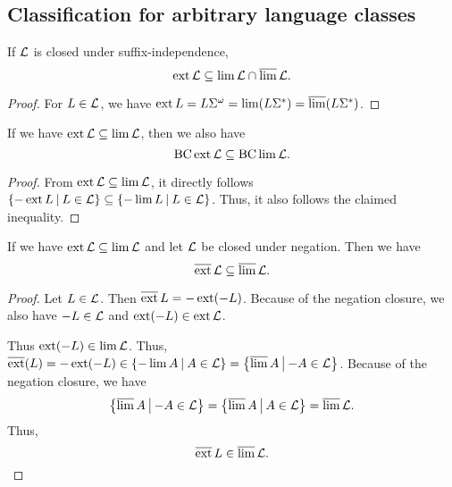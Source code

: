 \subsection{Classification for arbitrary language classes}
\label{gen:general}

\begin{lemma}
\label{gen:non-suffix-sens}
If $\mathcal{L}$ is closed under suffix-independence,
\[ \operatorname{ext} \mathcal{L} \subseteq \lim \mathcal{L} \cap \operatorname{\overline{lim}} \mathcal{L} . \]
\begin{proof}
For $L \in \mathcal{L}$, we have $\operatorname{ext} L = L \Sigma^\omega = \lim (L \Sigma^*) = \operatorname{\overline{lim}} (L \Sigma^*)$.
\end{proof}
\end{lemma}

\begin{lemma}
\label{gen:S302a} If we have $\operatorname{ext} \mathcal{L} \subseteq \lim \mathcal{L}$, then we also have
\[ \operatorname{BC} \operatorname{ext} \mathcal{L} \subseteq \operatorname{BC} \lim \mathcal{L} . \]
\begin{proof}
From $\operatorname{ext} \mathcal{L} \subseteq \lim \mathcal{L}$, it directly follows $\Set{-\ext L}{L \in \Lang} \subseteq \Set{-\lim L}{L \in \Lang}$. Thus, it also follows the claimed inequality.
\end{proof}
\end{lemma}

\begin{lemma}
\label{gen:DExtInDLim}
If we have $\operatorname{ext} \mathcal{L} \subseteq \lim \mathcal{L}$ and let $\mathcal{L}$ be closed under negation. Then we have
\[ \operatorname{\overline{ext}} \mathcal{L} \subseteq \operatorname{\overline{lim}} \mathcal{L} . \]
\begin{proof}
Let $L \in \mathcal{L}$. Then $ \operatorname{\overline{ext}} L = - \operatorname{ext} (-L) $. Because of the negation closure, we also have $-L \in \mathcal{L}$ and $\operatorname{ext}(-L) \in \operatorname{ext} \mathcal{L}$.

Thus $\operatorname{ext}(-L) \in \lim \mathcal{L}$. Thus, $\dext(L) = -\ext(-L) \in \Set{-\lim A}{A \in \Lang} = \Set{\dlim A}{-A \in \Lang}$. Because of the negation closure, we have
\[ \Set{\dlim A}{-A \in \Lang} = \Set{\dlim A}{A \in \Lang} = \dlim \Lang . \]
Thus,
\[ \operatorname{\overline{ext}} L \in \operatorname{\overline{lim}} \mathcal{L} . \]
\end{proof}
\end{lemma}

